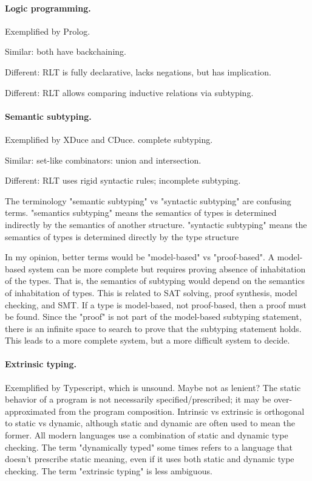 \documentclass[acmsmall]{acmart}
\begin{document}
\paragraph{Logic programming.}
Exemplified by Prolog. 

Similar: both have backchaining. 

Different: RLT is fully declarative, lacks negations, but has implication. 

Different: RLT allows comparing inductive relations via subtyping. 

\paragraph{Semantic subtyping.} 
Exemplified by XDuce and CDuce. complete subtyping.

Similar: set-like combinators: union and intersection.

Different: RLT uses rigid syntactic rules; incomplete subtyping.

The terminology "semantic subtyping" vs "syntactic subtyping" are confusing terms. 
"semantics subtyping" means the semantics of types is determined indirectly by the semantics of another structure.
"syntactic subtyping" means the semantics of types is determined directly by the type structure

In my opinion, better terms would be "model-based" vs "proof-based".
A model-based system can be more complete but requires proving absence of inhabitation of the types.
That is, the semantics of subtyping would depend on the semantics of inhabitation of types.
This is related to SAT solving, proof synthesis, model checking, and SMT.
If a type is model-based, not proof-based, then a proof must be found.
Since the "proof" is not part of the model-based subtyping statement, 
there is an infinite space to search to prove that the subtyping statement holds.
This leads to a more complete system, but a more difficult system to decide.

\paragraph{Extrinsic typing.}
Exemplified by Typescript, which is unsound. Maybe not as lenient?  
The static behavior of a program is not necessarily specified/prescribed; 
it may be over-approximated from the program composition. 
Intrinsic vs extrinsic is orthogonal to static vs dynamic, although static and dynamic are often used to mean the former.
All modern languages use a combination of static and dynamic type checking.
The term "dynamically typed" some times refers to a language that doesn't prescribe static meaning,
even if it uses both static and dynamic type checking. The term "extrinsic typing" is less ambiguous.
\end{document}
